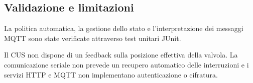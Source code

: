 \subsection{Validazione e limitazioni}%
\label{subsec:cus-validation}

La politica automatica, la gestione dello stato e l'interpretazione dei messaggi MQTT sono state verificate attraverso test unitari JUnit.

Il CUS non dispone di un feedback sulla posizione effettiva della valvola.
La comunicazione seriale non prevede un recupero automatico delle interruzioni e i servizi HTTP e MQTT non implementano autenticazione o cifratura.
